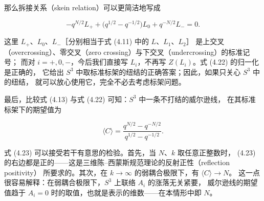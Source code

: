 \documentclass[11pt,a4paper]{article}
\begin{document}
那么拆接关系（skein relation）可以更简洁地写成

\begin{equation}
    -q^{N/2}L_+ + \bigl(q^{1/2}-q^{-1/2}\bigr)L_0 + q^{-N/2}L_- = 0. \tag{4.22}
\end{equation}

这里 $L_+$、$L_0$、$L_-$［分别相当于式 (4.11) 中的 $L$、$L_1$、$L_2$］
是上交叉（overcrossing）、零交叉（zero crossing）与下交叉（undercrossing）的标准记号；
而对 $i=+,0,-$，今后我们直接写 $L_i$，不再写 $Z(L_i)$。式 (4.22) 的归一化是正确的，
它给出 $S^3$ 中取标准标架的纽结的正确答案；因此，如果只关心 $S^3$ 中的纽结，
就可以放心使用它，完全不必去考虑标架问题。

最后，比较式 (4.13) 与式 (4.22) 可知：$S^3$ 中一条不打结的威尔逊线，
在其标准标架下的期望值为

\begin{equation}
    \langle C\rangle = \frac{q^{N/2}-q^{-N/2}}{q^{1/2}-q^{-1/2}}. \tag{4.23}
\end{equation}


式 (4.23) 可以接受若干有意思的检验。首先，当 $N$、$k$ 取任意正整数时，
(4.23) 的右边都是正的——这是三维陈–西蒙斯规范理论的反射正性（reflection positivity）
所要求的。其次，在 $k\to\infty$ 的弱耦合极限下，有 $\langle C\rangle\to N$。
这一点很容易解释：在弱耦合极限下，$S^3$ 上联络 $A_i$ 的涨落无关紧要，
威尔逊线的期望值趋于 $A_i=0$ 时的取值，也就是表示的维数——在本情形中即 $N$。
\end{document}
